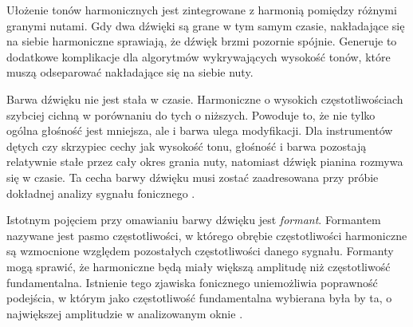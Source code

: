\documentclass[12pt,a4paper,twoside]{mwart}
\begin{document}
Ułożenie tonów harmonicznych jest zintegrowane z harmonią pomiędzy różnymi granymi nutami. Gdy dwa dźwięki są grane w tym samym czasie, nakładające się na siebie harmoniczne sprawiają, że dźwięk brzmi pozornie spójnie. Generuje to dodatkowe komplikacje dla algorytmów wykrywających wysokość tonów, które muszą odseparować nakładające się na siebie nuty.

Barwa dźwięku nie jest stała w czasie. Harmoniczne o wysokich częstotliwościach szybciej cichną w porównaniu do tych o niższych. Powoduje to, że nie tylko ogólna głośność jest mniejsza, ale i barwa ulega modyfikacji. Dla instrumentów dętych czy skrzypiec cechy jak wysokość tonu, głośność i barwa pozostają relatywnie stałe przez cały okres grania nuty, natomiast dźwięk pianina rozmywa się w czasie. Ta cecha barwy dźwięku musi zostać zaadresowana przy próbie dokładnej analizy sygnału fonicznego \cite[64-65]{Homerecording:DlaKazdego} \cite[804–816]{Transcription:Klapuri:MultipleFundamentalFrequencyEstimation}.

Istotnym pojęciem przy omawianiu barwy dźwięku jest \textit{formant}. Formantem nazywane jest pasmo częstotliwości, w którego obrębie częstotliwości harmoniczne są wzmocnione względem pozostałych częstotliwości danego sygnału. Formanty mogą sprawić, że harmoniczne będą miały większą amplitudę niż częstotliwość fundamentalna. Istnienie tego zjawiska fonicznego uniemożliwia poprawność podejścia, w którym jako częstotliwość fundamentalna wybierana była by ta, o największej amplitudzie w analizowanym oknie \cite[62-63]{BarwaDzwieku:Formant}.
\newpage
\end{document}
